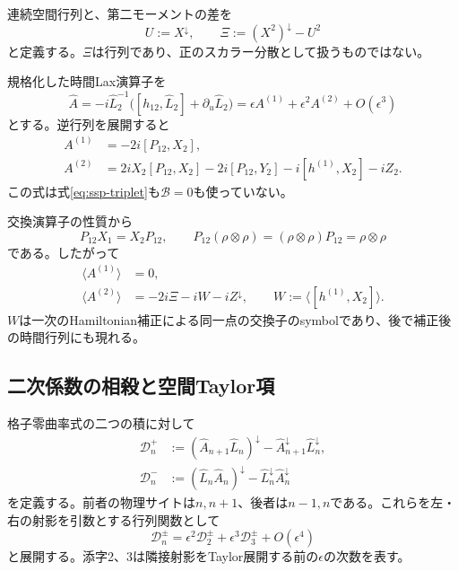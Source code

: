 連続空間行列と、第二モーメントの差を
\begin{equation}
U:=X^\downarrow,\qquad\Xi:=(X^2)^\downarrow-U^2
\label{eq:ssp-Xi}
\end{equation}
と定義する。$\Xi$は行列であり、正のスカラー分散として扱うものではない。

規格化した時間Lax演算子を
\begin{equation}
\widehat A=-i\widehat L_2^{-1}
\bigl([h_{12},\widehat L_2]+\partial_u\widehat L_2\bigr)
=\epsilon A^{(1)}+\epsilon^2A^{(2)}+O(\epsilon^3)
\label{eq:ssp-A}
\end{equation}
とする。逆行列を展開すると
\begin{align}
A^{(1)}&=-2i[P_{12},X_2],\label{eq:ssp-A1}\\
A^{(2)}&=2iX_2[P_{12},X_2]-2i[P_{12},Y_2]
-i[h^{(1)},X_2]-iZ_2.\label{eq:ssp-A2}
\end{align}
この式は式\eqref{eq:ssp-triplet}も$\mathcal B=0$も使っていない。

交換演算子の性質から
\begin{equation}
P_{12}X_1=X_2P_{12},\qquad
P_{12}(\rho\otimes\rho)=(\rho\otimes\rho)P_{12}=\rho\otimes\rho
\label{eq:ssp-perm}
\end{equation}
である。したがって
\begin{align}
\langle A^{(1)}\rangle&=0,\label{eq:ssp-A1bar}\\
\langle A^{(2)}\rangle&=-2i\Xi-iW-iZ^\downarrow,
\qquad W:=\langle[h^{(1)},X_2]\rangle.\label{eq:ssp-A2bar}
\end{align}
$W$は一次のHamiltonian補正による同一点の交換子のsymbolであり、後で補正後の時間行列にも現れる。

\subsection{二次係数の相殺と空間Taylor項}

格子零曲率式の二つの積に対して
\begin{align}
\mathcal D^+_n&:=(\widehat A_{n+1}\widehat L_n)^\downarrow
-\widehat A_{n+1}^\downarrow\widehat L_n^\downarrow,\\
\mathcal D^-_n&:=(\widehat L_n\widehat A_n)^\downarrow
-\widehat L_n^\downarrow\widehat A_n^\downarrow
\end{align}
を定義する。前者の物理サイトは$n,n+1$、後者は$n-1,n$である。これらを左・右の射影を引数とする行列関数として
\begin{equation}
\mathcal D_n^\pm=\epsilon^2\mathcal D_2^\pm
+\epsilon^3\mathcal D_3^\pm+O(\epsilon^4)
\label{eq:ssp-Dseries}
\end{equation}
と展開する。添字2、3は隣接射影をTaylor展開する前の$\epsilon$の次数を表す。

